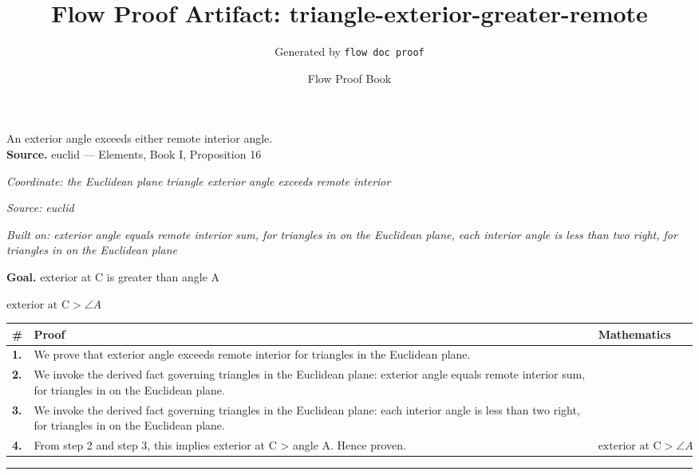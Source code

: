 \documentclass[11pt]{article}
\title{Flow Proof Artifact: triangle-exterior-greater-remote}
\author{Generated by \texttt{flow doc proof}}
\date{Flow Proof Book}
\theoremstyle{definition}
\begin{document}
\maketitle
An exterior angle exceeds either remote interior angle.\\[0.5em]
\textbf{Source.} euclid — Elements, Book I, Proposition 16\\[0.5em]
\bigskip
{}\par
\smallskip\noindent\textit{Coordinate: the Euclidean plane \cdot triangle \cdot exterior angle exceeds remote interior}\par
\smallskip\noindent\textit{Source: euclid}\par
\smallskip\noindent\textit{Built on: exterior angle equals remote interior sum, for triangles in on the Euclidean plane, each interior angle is less than two right, for triangles in on the Euclidean plane}\par
\medskip
\noindent\textbf{Goal.} exterior at C is greater than angle A\par
\noindent$\displaystyle \text{exterior at C} > \angle A$\par
\medskip
\noindent
\begin{tabular}{@{} >{\raggedright\arraybackslash}p{} >{\raggedright\arraybackslash}p{} >{\raggedleft\arraybackslash}p{} @{}}
\textbf{\#} & \textbf{Proof} & \textbf{Mathematics} \\
\midrule
\textbf{1.} & We prove that exterior angle exceeds remote interior for triangles in the Euclidean plane. & \\[0.45em]
\textbf{2.} & We invoke the derived fact governing triangles in the Euclidean plane: exterior angle equals remote interior sum, for triangles in on the Euclidean plane. & \\[0.45em]
\textbf{3.} & We invoke the derived fact governing triangles in the Euclidean plane: each interior angle is less than two right, for triangles in on the Euclidean plane. & \\[0.45em]
\textbf{4.} & From step 2 and step 3, this implies exterior at C > angle A. Hence proven. & $\displaystyle \text{exterior at C} > \angle A$ \\[0.45em]
\bottomrule
\end{tabular}
\label{thm:Geometry-triangle-exterior_angle_exceeds_remote_interior}
\par\medskip\hrule
\end{document}
